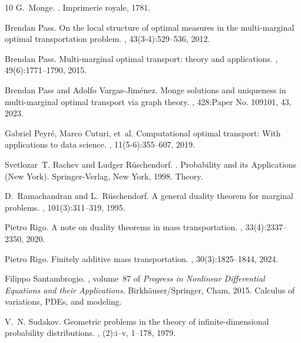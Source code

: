 \documentclass[twoside,11pt,a4paper]{article}
\begin{document}
\begin{thebibliography}{10}
G.~Monge.
.
\newblock Imprimerie royale, 1781.

Brendan Pass.
\newblock On the local structure of optimal measures in the multi-marginal
  optimal transportation problem.
, 43(3-4):529--536,
  2012.

Brendan Pass.
\newblock Multi-marginal optimal transport: theory and applications.
, 49(6):1771--1790, 2015.

Brendan Pass and Adolfo Vargas-Jim\'{e}nez.
\newblock Monge solutions and uniqueness in multi-marginal optimal transport
  via graph theory.
, 428:Paper No. 109101, 43, 2023.

Gabriel Peyr{\'e}, Marco Cuturi, et~al.
\newblock Computational optimal transport: With applications to data science.
,
  11(5-6):355--607, 2019.

Svetlozar~T. Rachev and Ludger R\"{u}schendorf.
.
\newblock Probability and its Applications (New York). Springer-Verlag, New
  York, 1998.
\newblock Theory.

D.~Ramachandran and L.~R\"{u}schendorf.
\newblock A general duality theorem for marginal problems.
, 101(3):311--319, 1995.

Pietro Rigo.
\newblock A note on duality theorems in mass transportation.
, 33(4):2337--2350, 2020.

Pietro Rigo.
\newblock Finitely additive mass transportation.
, 30(3):1825--1844, 2024.

Filippo Santambrogio.
, volume~87 of {\em
  Progress in Nonlinear Differential Equations and their Applications}.
\newblock Birkh\"{a}user/Springer, Cham, 2015.
\newblock Calculus of variations, PDEs, and modeling.

V.~N. Sudakov.
\newblock Geometric problems in the theory of infinite-dimensional probability
  distributions.
, (2):i--v, 1--178, 1979.


\end{thebibliography}
\end{document}

